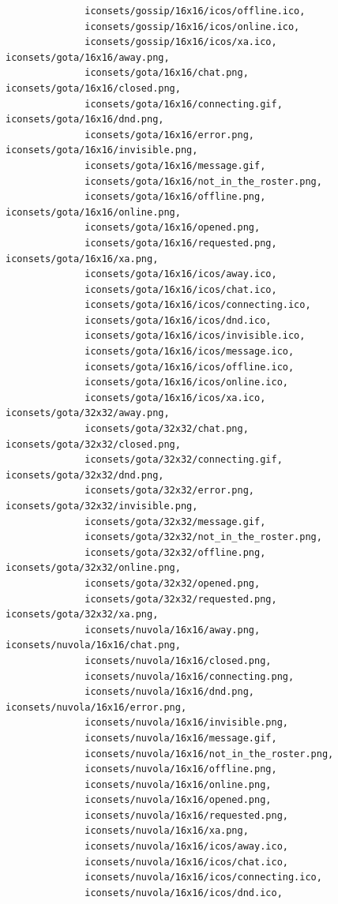 \documentclass[a4paper]{article}
\begin{document}
\begin{verbatim}
              iconsets/gossip/16x16/icos/offline.ico,
              iconsets/gossip/16x16/icos/online.ico,
              iconsets/gossip/16x16/icos/xa.ico, iconsets/gota/16x16/away.png,
              iconsets/gota/16x16/chat.png, iconsets/gota/16x16/closed.png,
              iconsets/gota/16x16/connecting.gif, iconsets/gota/16x16/dnd.png,
              iconsets/gota/16x16/error.png, iconsets/gota/16x16/invisible.png,
              iconsets/gota/16x16/message.gif,
              iconsets/gota/16x16/not_in_the_roster.png,
              iconsets/gota/16x16/offline.png, iconsets/gota/16x16/online.png,
              iconsets/gota/16x16/opened.png,
              iconsets/gota/16x16/requested.png, iconsets/gota/16x16/xa.png,
              iconsets/gota/16x16/icos/away.ico,
              iconsets/gota/16x16/icos/chat.ico,
              iconsets/gota/16x16/icos/connecting.ico,
              iconsets/gota/16x16/icos/dnd.ico,
              iconsets/gota/16x16/icos/invisible.ico,
              iconsets/gota/16x16/icos/message.ico,
              iconsets/gota/16x16/icos/offline.ico,
              iconsets/gota/16x16/icos/online.ico,
              iconsets/gota/16x16/icos/xa.ico, iconsets/gota/32x32/away.png,
              iconsets/gota/32x32/chat.png, iconsets/gota/32x32/closed.png,
              iconsets/gota/32x32/connecting.gif, iconsets/gota/32x32/dnd.png,
              iconsets/gota/32x32/error.png, iconsets/gota/32x32/invisible.png,
              iconsets/gota/32x32/message.gif,
              iconsets/gota/32x32/not_in_the_roster.png,
              iconsets/gota/32x32/offline.png, iconsets/gota/32x32/online.png,
              iconsets/gota/32x32/opened.png,
              iconsets/gota/32x32/requested.png, iconsets/gota/32x32/xa.png,
              iconsets/nuvola/16x16/away.png, iconsets/nuvola/16x16/chat.png,
              iconsets/nuvola/16x16/closed.png,
              iconsets/nuvola/16x16/connecting.png,
              iconsets/nuvola/16x16/dnd.png, iconsets/nuvola/16x16/error.png,
              iconsets/nuvola/16x16/invisible.png,
              iconsets/nuvola/16x16/message.gif,
              iconsets/nuvola/16x16/not_in_the_roster.png,
              iconsets/nuvola/16x16/offline.png,
              iconsets/nuvola/16x16/online.png,
              iconsets/nuvola/16x16/opened.png,
              iconsets/nuvola/16x16/requested.png,
              iconsets/nuvola/16x16/xa.png,
              iconsets/nuvola/16x16/icos/away.ico,
              iconsets/nuvola/16x16/icos/chat.ico,
              iconsets/nuvola/16x16/icos/connecting.ico,
              iconsets/nuvola/16x16/icos/dnd.ico,

\end{verbatim}
\end{document}
